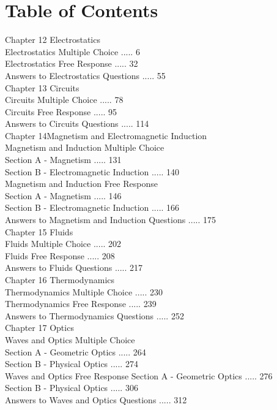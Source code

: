 \section*{Table of Contents}
Chapter 12 Electrostatics\\
Electrostatics Multiple Choice ..... 6\\
Electrostatics Free Response ..... 32\\
Answers to Electrostatics Questions ..... 55\\
Chapter 13 Circuits\\
Circuits Multiple Choice ..... 78\\
Circuits Free Response ..... 95\\
Answers to Circuits Questions ..... 114\\
Chapter 14Magnetism and Electromagnetic Induction\\
Magnetism and Induction Multiple Choice\\
Section A - Magnetism ..... 131\\
Section B - Electromagnetic Induction ..... 140\\
Magnetism and Induction Free Response\\
Section A - Magnetism ..... 146\\
Section B - Electromagnetic Induction ..... 166\\
Answers to Magnetism and Induction Questions ..... 175\\
Chapter 15 Fluids\\
Fluids Multiple Choice ..... 202\\
Fluids Free Response ..... 208\\
Answers to Fluids Questions ..... 217\\
Chapter 16 Thermodynamics\\
Thermodynamics Multiple Choice ..... 230\\
Thermodynamics Free Response ..... 239\\
Answers to Thermodynamics Questions ..... 252\\
Chapter 17 Optics\\
Waves and Optics Multiple Choice\\
Section A - Geometric Optics ..... 264\\
Section B - Physical Optics ..... 274\\
Waves and Optics Free Response Section A - Geometric Optics ..... 276\\
Section B - Physical Optics ..... 306\\
Answers to Waves and Optics Questions ..... 312\\
